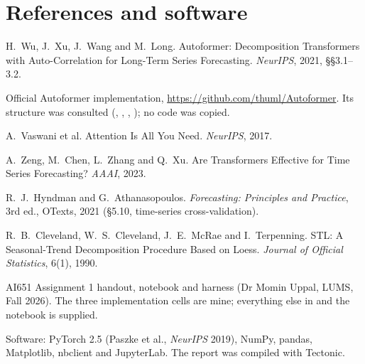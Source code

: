 \section*{References and software}
\begin{enumerate}[label={[\arabic*]},leftmargin=2.2em]
  \item H.~Wu, J.~Xu, J.~Wang and M.~Long. Autoformer: Decomposition Transformers with Auto-Correlation for Long-Term Series Forecasting. \emph{NeurIPS}, 2021, \S\S3.1--3.2.
  \item Official Autoformer implementation, \url{https://github.com/thuml/Autoformer}. Its structure was consulted (, , , ); no code was copied.
  \item A.~Vaswani et al. Attention Is All You Need. \emph{NeurIPS}, 2017.
  \item A.~Zeng, M.~Chen, L.~Zhang and Q.~Xu. Are Transformers Effective for Time Series Forecasting? \emph{AAAI}, 2023.
  \item R.~J.~Hyndman and G.~Athanasopoulos. \emph{Forecasting: Principles and Practice}, 3rd ed., OTexts, 2021 (\S5.10, time-series cross-validation).
  \item R.~B.~Cleveland, W.~S.~Cleveland, J.~E.~McRae and I.~Terpenning. STL: A Seasonal-Trend Decomposition Procedure Based on Loess. \emph{Journal of Official Statistics}, 6(1), 1990.
  \item AI651 Assignment 1 handout, notebook and harness (Dr Momin Uppal, LUMS, Fall 2026). The three implementation cells are mine; everything else in  and the notebook is supplied.
  \item Software: PyTorch 2.5 (Paszke et al., \emph{NeurIPS} 2019), NumPy, pandas, Matplotlib, nbclient and JupyterLab. The report was compiled with Tectonic.
\end{enumerate}
